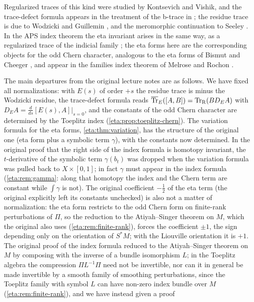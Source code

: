 Regularized traces of this kind were studied by Kontsevich and Vishik, and the
trace-defect formula appears in the treatment of the b-trace in \cite{Melrose-APS}; the
residue trace is due to Wodzicki
and Guillemin \cite{Wodzicki-residue,Guillemin-residue}, and the meromorphic
continuation to Seeley \cite{Seeley}. In the APS index theorem the eta invariant arises in
the same way, as a regularized trace of the indicial family \cite{Melrose-APS}; the eta
forms here are the corresponding objects for the odd Chern character, analogous to the
eta forms of Bismut and Cheeger \cite{Bismut-Cheeger}, and appear in the families index
theorem of Melrose and Rochon \cite{Melrose-Rochon}.

The main departures from the original lecture notes are as follows. We have fixed all
normalizations: with $E(s)$ of order $+s$ the residue trace is minus the Wodzicki residue,
the trace-defect formula reads $\overline{\operatorname{Tr}}_E([A,B])=\operatorname{Tr}_{\mathrm{R}}(BD_EA)$ with
$D_EA=\frac{d}{ds}[E(s),A]|_{s=0}$, and the constants of the odd Chern character are
determined by the Toeplitz index (\cref{eta:prop:toeplitz-chern}). The variation formula
for the eta forms, \cref{eta:thm:variation}, has the structure of the original one (eta
form plus a symbolic term $\gamma$), with the constants now determined. In the original
proof that the right side of the index formula is homotopy invariant, the $t$-derivative of
the symbolic term $\gamma(b_t)$ was dropped when the variation formula was pulled back to
$X\times[0,1]$; in fact $\gamma$ must appear in the index formula (\cref{eta:rem:gamma}: along
that homotopy the index and the Chern term are constant while $\int\gamma$ is not). The
original coefficient $-\frac12$ of the eta term (the original explicitly left its constants
unchecked) is also not a matter of normalization: the eta form restricts to the odd Chern
form on finite-rank perturbations of $\Pi$, so the reduction to the Atiyah--Singer theorem on
$M$, which the original also uses (\cref{eta:rem:finite-rank}), forces the coefficient $\pm1$,
the sign depending only on the orientation of $S^*M$; with the Liouville orientation it is
$+1$. The original proof of the index formula reduced to the Atiyah--Singer theorem on $M$ by
composing with the inverse of a bundle isomorphism $L$; in the Toeplitz algebra the
compression $\Pi L^{-1}\Pi$ need not be invertible, nor can it in general be made
invertible by a smooth family of smoothing perturbations, since the Toeplitz family with symbol $L$ can have non-zero index bundle over $M$
(\cref{eta:rem:finite-rank}), and we have instead given a proof
